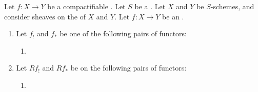 \begin{definition} \label{definition:canonical_forgets_support_map_from_direct_image_with_compact_support_to_direct_image_for_etale_sheaves_on_compactifiable_morphisms_of_schemes}
    Let $f: X \to Y$ be a compactifiable . 
    Let $S$ be a . Let $X$ and $Y$ be $S$-schemes, and consider sheaves on the  of $X$ and $Y$. Let $f: X \to Y$ be an .
    \begin{enumerate}
        \item Let $f_!$ and $f_*$ be one of the following pairs of functors:
        \begin{enumerate}
            \item {}
        \end{enumerate}

        \item Let $Rf_!$ and $Rf_*$ be on the following pairs of functors:
        \begin{enumerate}
            \item {}
        \end{enumerate}
    \end{enumerate}



\end{definition}
